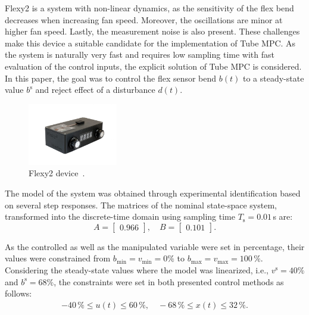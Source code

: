 \documentclass[letterpaper, 10 pt, conference]{ieeeconf}
\begin{document}
Flexy2 is a system with non-linear dynamics, as the sensitivity of the flex bend decreases when increasing fan speed. Moreover, the oscillations are minor at higher fan speed. Lastly, the measurement noise is also present. These challenges make this device a suitable candidate for the implementation of Tube MPC. As the system is naturally very fast and requires low sampling time with fast evaluation of the control inputs, the explicit solution of Tube MPC is considered. In this paper, the goal was to control the flex sensor bend $b(t)$ to a steady-state value $b^\text{s}$ and reject effect of a disturbance $d(t)$.

\begin{figure}
	\begin{center}
		\includegraphics[width=0.35\textwidth]{images/flexy2}
		\caption{Flexy2 device~\cite{flexy2}.}
		\label{fig:flexy2}
	\end{center}
\end{figure}

The model of the system was obtained through experimental identification based on several step responses. The matrices of the nominal state-space system, transformed into the discrete-time domain using sampling time $T_\mathrm{s} = 0.01$\,s are:
\begin{equation}
	\label{eq:model_A_B} 
		A = \begin{bmatrix}
			0.966
		\end{bmatrix}, \quad 
		B = \begin{bmatrix}
			0.101
		\end{bmatrix}. 
\end{equation}

As the controlled as well as the manipulated variable were set in percentage, their values were constrained from $b_{\min} = v_{\min} = 0\%$ to $b_{\max} = v_{\max} = 100\,\%$. Considering the steady-state values where the model was linearized, i.e., $ v^\mathrm{s} = 40\%$ and $ b^\mathrm{s} = 68\%$, the constraints were set in both presented control methods as follows: 
\begin{eqnarray}
\label{eq:const_u_y}
	-40\,\% \le u(t) \le 60\,\%, \quad -68\,\% \le x(t) \le 32\,\%.
\end{eqnarray}
\end{document}
